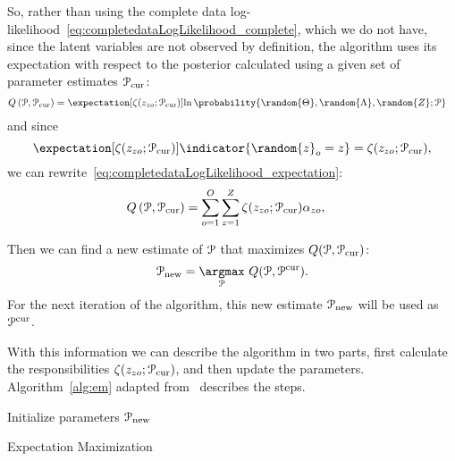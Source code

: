 \documentclass[../main.tex]{subfiles}
\begin{document}
So, rather than using the complete data log-likelihood~\eqref{eq:completedataLogLikelihood_complete}, which we do not have, since the latent variables are not observed by definition, the \EM{} algorithm uses its expectation with respect to the posterior calculated using a given set of parameter estimates $\mathcal{P}_{\mathrm{cur}}$:
\begin{align}
  \label{eq:completedataLogLikelihood_expectation}
  Q\left(\set{P},\set{P}_{\mathrm{cur}}\right) &= \expectation[{\zeta(z_{zo};\set{P}_{\mathrm{cur}})}]{\ln\probability{\random{\Theta},\random{\Lambda},\random{Z};\set{P}}}
\end{align}
and since \[\expectation[{\zeta(z_{zo};\set{P}_{\mathrm{cur}})}]{\indicator{\random{z}_{o}=z}}=\zeta(z_{zo};\set{P}_{\mathrm{cur}}),\]
we can rewrite~\eqref{eq:completedataLogLikelihood_expectation}:
\begin{align}
  \label{eq:completedataLogLikelihood_expectation_developed}
  Q\left(\mathcal{P},\mathcal{P}_{\mathrm{cur}}\right) &= \sum_{o=1}^{O}\sum_{z=1}^{Z}  \zeta(z_{zo};\mathcal{P}_{\mathrm{cur}})\alpha_{zo},
\end{align}

Then we can find a new estimate of $\mathcal{P}$ that maximizes $Q(\mathcal{P},\mathcal{P}_{\mathrm{cur}})$:
\begin{equation} \label{eq:Mstep}
  \set{P}_{\mathrm{new}}=\underset{\set{P}}{\argmax}\ Q(\set{P},\set{P}^{\mathrm{cur}}).
\end{equation}
For the next iteration of the algorithm, this new estimate $\mathcal{P}_{\mathrm{new}}$ will be used as $\mathcal{P}^{\mathrm{cur}}$.

With this information we can describe the \EM{} algorithm in two parts, first calculate the responsibilities $\zeta(z_{zo};\mathcal{P}_{\mathrm{cur}})$, and then update the parameters.
Algorithm~\ref{alg:em} adapted from~\mbox{\cite[Chapter 9]{Bishop2006}} describes the steps.

\begin{algorithm2e}[h]
  \DontPrintSemicolon%
  Initialize parameters $\mathcal{P}_{\mathrm{new}}$\;
  \caption{Expectation Maximization}\label{alg:em}
\end{algorithm2e}
\end{document}

